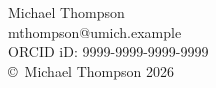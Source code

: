 \thispagestyle{empty}
\vspace*{\fill}
\begin{center}
Michael Thompson\\
mthompson@umich.example\\
ORCID iD: 9999-9999-9999-9999\\[1em]
\copyright\ Michael Thompson 2026
\end{center}
\vspace*{\fill}
\clearpage
